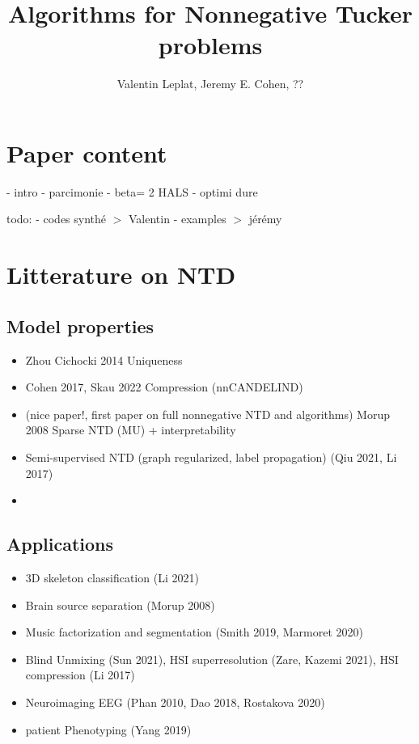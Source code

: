 \documentclass[a4paper, 11pt]{article}
\title{Algorithms for Nonnegative Tucker problems}
\author{Valentin Leplat, Jeremy E. Cohen, ??}
\date{}
\begin{document}
\maketitle

\section{Paper content}
- intro
- parcimonie
- beta= 2 HALS
- optimi dure


todo:
- codes synthé $>$ Valentin
- examples $>$ jérémy

\section{Litterature on NTD}

\subsection{Model properties}
\begin{itemize}
    \item Zhou Cichocki 2014 Uniqueness 
    \item Cohen 2017, Skau 2022 Compression (nnCANDELIND)
    \item (nice paper!, first paper on full nonnegative NTD and algorithms) Morup 2008 Sparse NTD (MU) + interpretability
    \item Semi-supervised NTD (graph regularized, label propagation) (Qiu 2021, Li 2017)
    \item 
\end{itemize}

\subsection{Applications}

\begin{itemize}
    \item 3D skeleton classification (Li 2021)
    \item Brain source separation (Morup 2008)
    \item Music factorization and segmentation (Smith 2019, Marmoret 2020)
    \item Blind Unmixing (Sun 2021), HSI superresolution (Zare, Kazemi 2021), HSI compression (Li 2017)
    \item Neuroimaging EEG (Phan 2010, Dao 2018, Rostakova 2020)
    \item patient Phenotyping (Yang 2019)
\end{itemize}
\end{document}
